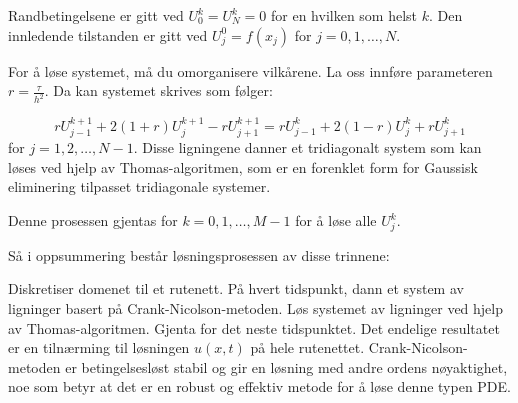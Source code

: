 Randbetingelsene er gitt ved $U_0^k = U_N^k = 0$ for en hvilken som helst $k$. Den innledende tilstanden er gitt ved $U_j^0=f(x_j)$ for $j=0,1,\ldots,N$.

For å løse systemet, må du omorganisere vilkårene. La oss innføre parameteren $r=\frac{\tau}{h^2}$. Da kan systemet skrives som følger:

\begin{equation*}
    r U_{j-1}^{k+1} + 2(1+r) U_j^{k+1} - r U_{j+1}^{k+1} = r U_{j-1}^k + 2(1-r) U_j^k + r U_{j+1}^k
\end{equation*}
for $j = 1,2,\ldots,N-1$. Disse ligningene danner et tridiagonalt system som kan løses ved hjelp av Thomas-algoritmen, som er en forenklet form for Gaussisk eliminering tilpasset tridiagonale systemer.

Denne prosessen gjentas for $k=0,1,\ldots,M-1$ for å løse alle $U_j^k$.

Så i oppsummering består løsningsprosessen av disse trinnene:

Diskretiser domenet til et rutenett.
På hvert tidspunkt, dann et system av ligninger basert på Crank-Nicolson-metoden.
Løs systemet av ligninger ved hjelp av Thomas-algoritmen.
Gjenta for det neste tidspunktet.
Det endelige resultatet er en tilnærming til løsningen $u(x,t)$ på hele rutenettet. Crank-Nicolson-metoden er betingelsesløst stabil og gir en løsning med andre ordens nøyaktighet, noe som betyr at det er en robust og effektiv metode for å løse denne typen PDE.